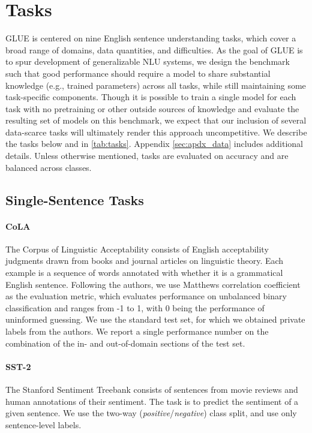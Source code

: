 \section{Tasks}\label{sec:tasks}

GLUE is centered on nine English sentence understanding tasks, which  cover a broad range of domains, data quantities, and difficulties.
As the goal of GLUE is to spur development of generalizable NLU systems, we design the benchmark such that good performance should require a model to share substantial knowledge (e.g., trained parameters) across all tasks, while still maintaining some task-specific components.
Though it is possible to train a single model for each task with no pretraining or other outside sources of knowledge and evaluate the resulting set of models on this benchmark, 
we expect that our inclusion of several data-scarce tasks will ultimately render this approach uncompetitive.
We describe the tasks below and in \autoref{tab:tasks}.  Appendix \ref{sec:apdx_data} includes additional details. Unless otherwise mentioned, tasks are evaluated on accuracy and are balanced across classes.

\subsection{Single-Sentence Tasks}

\paragraph{CoLA}
The Corpus of Linguistic Acceptability \citep{warstadt2018neural}
consists of English acceptability judgments drawn from books and journal articles on linguistic theory.
Each example is a sequence of words annotated with whether it is a grammatical English sentence. 
Following the authors, we use Matthews correlation coefficient \citep{matthews1975comparison} as the evaluation metric, which evaluates performance on unbalanced binary classification and ranges from -1 to 1, with 0 being the performance of uninformed guessing.
We use the standard test set, for which we obtained private labels from the authors.
We report a single performance number on the combination of the in- and out-of-domain sections of the test set.

\paragraph{SST-2}
The Stanford Sentiment Treebank \citep{socher2013recursive} consists of sentences from movie reviews and human annotations of their sentiment. The task is to predict the sentiment of a given sentence. We use the two-way (\textit{positive}/\textit{negative}) class split, and use only sentence-level labels.


